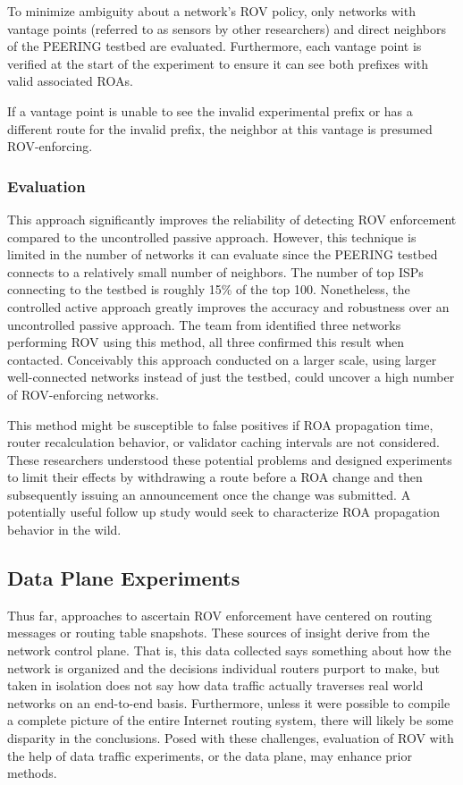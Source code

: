 \documentclass[sigconf]{acmart}
\begin{document}
To minimize ambiguity about a network's ROV policy, only networks with
vantage points (referred to as sensors by other researchers) and direct
neighbors of the PEERING testbed are evaluated.  Furthermore, each
vantage point is verified at the start of the experiment to ensure it
can see both prefixes with valid associated ROAs.

If a vantage point is unable to see the invalid experimental prefix or
has a different route for the invalid prefix, the neighbor at this
vantage is presumed ROV-enforcing.

\subsubsection{Evaluation}

This approach significantly improves the reliability of detecting ROV
enforcement compared to the uncontrolled passive approach.  However,
this technique is limited in the number of networks it can evaluate
since the PEERING testbed connects to a relatively small number of
neighbors. The number of top ISPs connecting to the testbed is roughly
15\% of the top 100.  Nonetheless, the controlled active approach
greatly improves the accuracy and robustness over an uncontrolled
passive approach.  The team from \cite{reuter_towards_2018} identified
three networks performing ROV using this method, all three confirmed
this result when contacted.  Conceivably this approach conducted on
a larger scale, using larger well-connected networks instead of just the
testbed, could uncover a high number of ROV-enforcing networks.

This method might be susceptible to false positives if ROA propagation
time, router recalculation behavior, or validator caching intervals are
not considered.  These researchers understood these potential problems
and designed experiments to limit their effects by withdrawing a route
before a ROA change and then subsequently issuing an announcement once
the change was submitted.  A potentially useful follow up study would
seek to characterize ROA propagation behavior in the wild.

\subsection{Data Plane Experiments}

Thus far, approaches to ascertain ROV enforcement have centered on
routing messages or routing table snapshots.  These sources of insight
derive from the network control plane.  That is, this data collected
says something about how the network is organized and the decisions
individual routers purport to make, but taken in isolation does not say
how data traffic actually traverses real world networks on an end-to-end
basis.  Furthermore, unless it were possible to compile a complete
picture of the entire Internet routing system, there will likely be some
disparity in the conclusions.  Posed with these challenges, evaluation
of ROV with the help of data traffic experiments, or the data plane, may
enhance prior methods.
\end{document}
